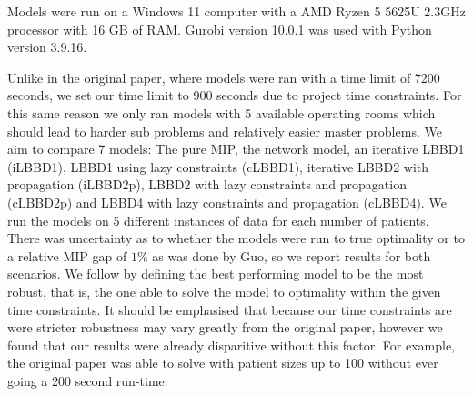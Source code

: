 Models were run on a Windows 11 computer with a AMD Ryzen 5 5625U 2.3GHz processor with 16 GB of RAM\@. Gurobi version 10.0.1 was used with Python version 3.9.16. 

Unlike in the original paper, where models were ran with a time limit of 7200 seconds, we set our time limit to 900 seconds due to project time constraints. For this same reason we only ran models with 5 available operating rooms which should lead to harder sub problems and relatively easier master problems\cite{roshanaei2017propagating}. We aim to compare 7 models: The pure MIP, the network model, an iterative LBBD1 (iLBBD1), LBBD1 using lazy constraints (cLBBD1), iterative LBBD2 with propagation (iLBBD2p), LBBD2 with lazy constraints and propagation (cLBBD2p) and LBBD4 with lazy constraints and propagation (cLBBD4). We run the models on 5 different instances of data for each number of patients. There was uncertainty as to whether the models were run to true optimality or to a relative MIP gap of $1\%$ as was done by Guo\cite{guo}, so we report results for both scenarios. We follow \cite{roshanaei2017propagating} by defining the best performing model to be the most robust, that is, the one able to solve the model to optimality within the given time constraints. It should be emphasised that because our time constraints are were stricter robustness may vary greatly from the original paper, however we found that our results were already disparitive without this factor. For example, the original paper was able to solve with patient sizes up to 100 without ever going a 200 second run-time.




